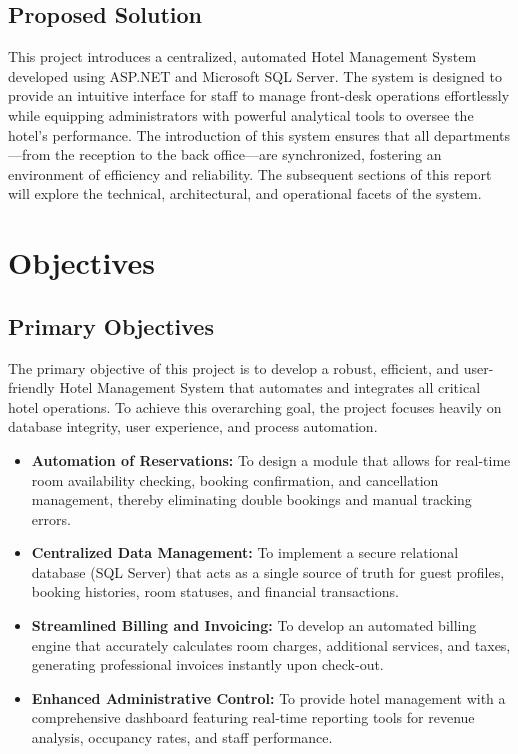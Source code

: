 \documentclass[12pt,a4paper]{article}
\begin{document}
\subsection{Proposed Solution}
This project introduces a centralized, automated Hotel Management System developed using ASP.NET and Microsoft SQL Server. The system is designed to provide an intuitive interface for staff to manage front-desk operations effortlessly while equipping administrators with powerful analytical tools to oversee the hotel's performance. The introduction of this system ensures that all departments—from the reception to the back office—are synchronized, fostering an environment of efficiency and reliability. The subsequent sections of this report will explore the technical, architectural, and operational facets of the system.

\newpage
\section{Objectives}

\subsection{Primary Objectives}
The primary objective of this project is to develop a robust, efficient, and user-friendly Hotel Management System that automates and integrates all critical hotel operations. To achieve this overarching goal, the project focuses heavily on database integrity, user experience, and process automation.

\begin{itemize}
    \item \textbf{Automation of Reservations:} To design a module that allows for real-time room availability checking, booking confirmation, and cancellation management, thereby eliminating double bookings and manual tracking errors.
    \item \textbf{Centralized Data Management:} To implement a secure relational database (SQL Server) that acts as a single source of truth for guest profiles, booking histories, room statuses, and financial transactions.
    \item \textbf{Streamlined Billing and Invoicing:} To develop an automated billing engine that accurately calculates room charges, additional services, and taxes, generating professional invoices instantly upon check-out.
    \item \textbf{Enhanced Administrative Control:} To provide hotel management with a comprehensive dashboard featuring real-time reporting tools for revenue analysis, occupancy rates, and staff performance.
\end{itemize}
\end{document}
